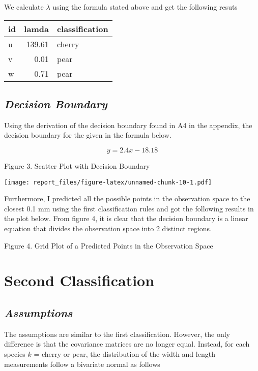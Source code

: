 \documentclass[]{article}
\begin{document}
We calculate \(\lambda\) using the formula stated above and get the
following resuts

\begin{table}[H]
\centering
\begin{tabular}{l|r|l}
\hline
id & lamda & classification\\
\hline
u & 139.61 & cherry\\
\hline
v & 0.01 & pear\\
\hline
w & 0.71 & pear\\
\hline
\end{tabular}
\end{table}

\subsection{\normalsize{\textit{Decision Boundary}}}

Using the derivation of the decision boundary found in A4 in the
appendix, the decision boundary for the given in the formula below.

\[y = 2.4x -18.18 \]

Figure 3. Scatter Plot with Decision Boundary

\texttt{[image: report\_files/figure-latex/unnamed-chunk-10-1.pdf]}

Furthermore, I predicted all the possible points in the observation
space to the closest 0.1 mm using the first classification rules and got
the following results in the plot below. From figure 4, it is clear that
the decision boundary is a linear equation that divides the observation
space into 2 distinct regions.

Figure 4. Grid Plot of a Predicted Points in the Observation Space

\newpage

\section{Second Classification}

\subsection{\normalsize{\textit{Assumptions}}}

The assumptions are similar to the first classification. However, the
only difference is that the covariance matrices are no longer equal.
Instead, for each species \(k\) = cherry or pear, the distribution of
the width and length measurements follow a bivariate normal as follows
\end{document}
